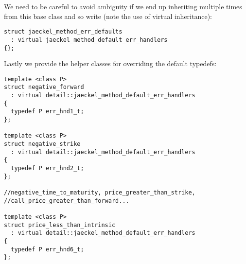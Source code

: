 \documentclass[a4paper,twoside,twocolumn]{article}
\begin{document}
We need to be careful to avoid ambiguity if we end up inheriting
multiple times from this base class and so write (note the use of
virtual inheritance):
\begin{verbatim}
struct jaeckel_method_err_defaults
  : virtual jaeckel_method_default_err_handlers
{};
\end{verbatim}
Lastly we provide the helper classes for overriding the default typedefs:
\begin{verbatim}
template <class P>
struct negative_forward
  : virtual detail::jaeckel_method_default_err_handlers
{
  typedef P err_hnd1_t;
};

template <class P>
struct negative_strike
  : virtual detail::jaeckel_method_default_err_handlers
{
  typedef P err_hnd2_t;
};

//negative_time_to_maturity, price_greater_than_strike,
//call_price_greater_than_forward...

template <class P>
struct price_less_than_intrinsic
  : virtual detail::jaeckel_method_default_err_handlers
{
  typedef P err_hnd6_t;
};
\end{verbatim}
\end{document}
